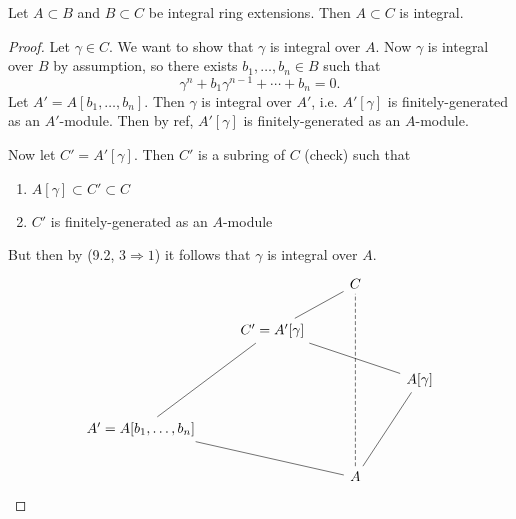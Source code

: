 \documentclass[12pt]{article}
\begin{document}
\begin{proposition}
	Let $A\subset B$ and $B\subset C$ be integral ring extensions. Then $A\subset C$ is integral.
\end{proposition}
\begin{proof}
	Let $\gamma\in C$. We want to show that $\gamma$ is integral over $A$. Now $\gamma$ is integral over $B$ by assumption, so there exists $b_1,\dots,b_n\in B$ such that 
	\begin{equation*}
		\gamma^n + b_1\gamma^{n-1}+\cdots + b_n = 0.
	\end{equation*}
	Let $A' = A[b_1,\dots,b_n]$. Then $\gamma$ is integral over $A'$, i.e. $A'[\gamma]$ is finitely-generated as an $A'$-module. Then by ref, $A'[\gamma]$ is finitely-generated as an $A$-module. 

	Now let $C'=A'[\gamma]$. Then $C'$ is a subring of $C$ (check) such that 
	\begin{enumerate}
		\item $A[\gamma]\subset C'\subset C$
		\item $C'$ is finitely-generated as an $A$-module
	\end{enumerate}
	But then by (9.2, $3\Rightarrow 1$) it follows that $\gamma$ is integral over $A$.
	\begin{equation*}
\begin{tikzcd}
                                           &                                     & C                                                                         &                                  \\
                                           & {C'=A'[\gamma]} \arrow[ru, no head] &                                                                           &                                  \\
                                           &                                     &                                                                           & {A[\gamma]} \arrow[llu, no head] \\
{A'=A[b_1,\dots,b_n]} \arrow[ruu, no head] &                                     &                                                                           &                                  \\
                                           &                                     & A \arrow[llu, no head] \arrow[ruu, no head] \arrow[uuuu, no head, dashed] &                                 
\end{tikzcd}
	\end{equation*}
\end{proof}
\end{document}
